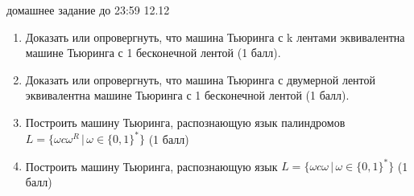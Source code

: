 \documentclass[12pt]{article}
\begin{document}

{\Large домашнее задание до 23:59 12.12}
\bigskip

\begin{enumerate}
  \item 
  {  Доказать или опровергнуть, что машина Тьюринга с k лентами эквивалентна машине Тьюринга с 1 бесконечной лентой (1 балл).
  }
  \item Доказать или опровергнуть, что машина Тьюринга с двумерной лентой эквивалентна машине Тьюринга с 1 бесконечной лентой (1 балл).
  \item Построить машину Тьюринга, распознающую язык палиндромов \\ $L = \{ \omega c \omega^R \, | \, \omega \in \{ 0, 1 \}^* \}$ (1 балл)
  \item Построить машину Тьюринга, распознающую язык $L = \{ \omega c \omega \, | \, \omega \in \{ 0, 1 \}^* \}$ (1 балл) 
\end{enumerate}
\end{document}
